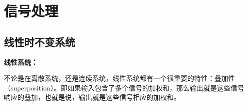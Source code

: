 \chapter{信号处理}
\section{线性时不变系统}

{\bf 线性系统：}

不论是在离散系统，还是连续系统，线性系统都有一个很重要的特性：叠加性（superposition）。即如果输入包含了多个信号的加权和，那么输出就是这些信号响应的叠加，也就是说，输出就是这些信号相应的加权和。

